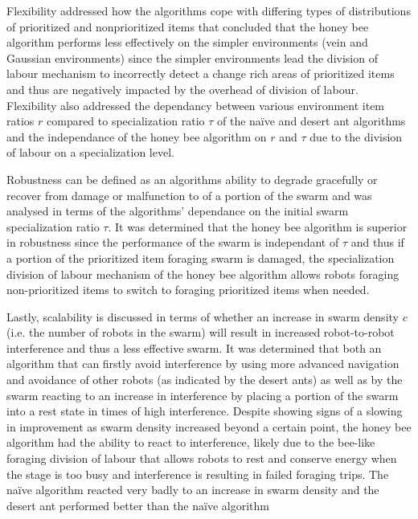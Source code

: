 Flexibility addressed how the algorithms cope with differing types of distributions of prioritized and nonprioritized items that concluded that the honey bee algorithm performs less effectively on the simpler environments (vein and Gaussian environments) since the simpler environments lead the division of labour mechanism to incorrectly detect a change rich areas of prioritized items and thus are negatively impacted by the overhead of division of labour. Flexibility also addressed the dependancy between various environment item ratios $r$ compared to specialization ratio $\tau$ of the na\"ive and desert ant algorithms and the independance of the honey bee algorithm on $r$ and $\tau$ due to the division of labour on a specialization level. 

Robustness can be defined as an algorithms ability to degrade gracefully or recover from damage or malfunction to of a portion of the swarm and was analysed in terms of the algorithms' dependance on the initial swarm specialization ratio $\tau$. It was determined that the honey bee algorithm is superior in robustness since the performance of the swarm is independant of $\tau$ and thus if a portion of the prioritized item foraging swarm is damaged, the specialization division of labour mechanism of the honey bee algorithm allows robots foraging non-prioritized items to switch to foraging prioritized items when needed.

Lastly, scalability is discussed in terms of whether an increase in swarm density $c$ (i.e. the number of robots in the swarm) will result in increased robot-to-robot interference and thus a less effective swarm. It was determined that both an algorithm that can firstly avoid interference by using more advanced navigation and avoidance of other robots (as indicated by the desert ants) as well as by the swarm reacting to an increase in interference by placing a portion of the swarm into a rest state in times of high interference. Despite showing signs of a slowing in improvement as swarm density increased beyond a certain point, the honey bee algorithm had the ability to react to interference, likely due to the bee-like foraging division of labour that allows robots to rest and conserve energy when the stage is too busy and interference is resulting in failed foraging trips. The na\"ive algorithm reacted very badly to an increase in swarm density and the desert ant performed better than the na\"ive algorithm 

